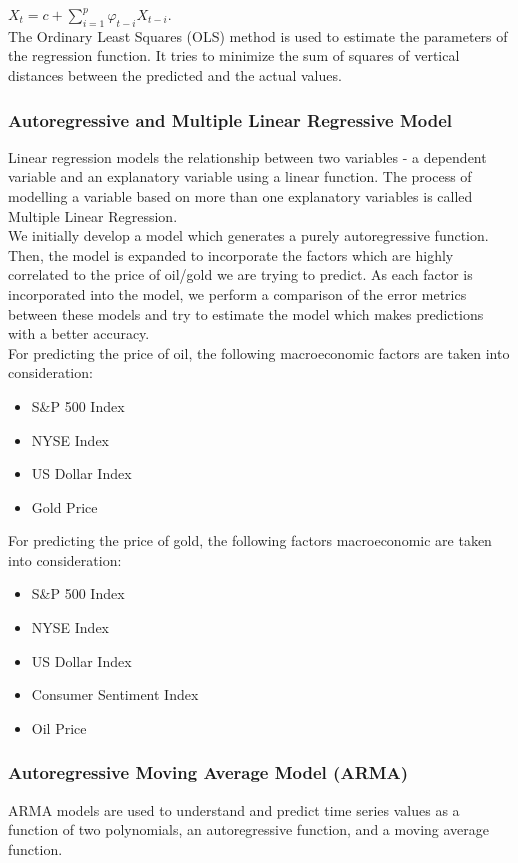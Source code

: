 \documentclass[runningheads]{llncs}
\begin{document}
$ X_{t} = c + \sum\limits_{i=1}^p \varphi_{t-i}X_{t-i}$. \\

\noindent The Ordinary Least Squares (OLS) method is used to estimate the parameters of the regression function. It tries to minimize the sum of squares of vertical distances between the predicted and the actual values. 

\subsubsection{Autoregressive and Multiple Linear Regressive Model}
Linear regression models the relationship between two variables - a dependent variable and an explanatory variable using a linear function. The process of modelling a variable based on more than one explanatory variables is called Multiple Linear Regression. \\
   
\noindent We initially develop a model which generates a purely autoregressive function. Then, the model is expanded to incorporate the factors which are highly correlated to the price of oil/gold we are trying to predict. As each factor is incorporated into the model, we perform a comparison of the error metrics between these models and try to estimate the model which makes predictions with a better accuracy.\\

For predicting the price of oil, the following macroeconomic factors are taken into consideration:
\begin {itemize}
\item S\&P 500 Index
\item NYSE Index
\item US Dollar Index
\item Gold Price
\end {itemize}

For predicting the price of gold, the following factors macroeconomic are taken into consideration:
\begin {itemize}
\item S\&P 500 Index
\item NYSE Index
\item US Dollar Index
\item Consumer Sentiment Index
\item Oil Price
\end {itemize}


\subsubsection{Autoregressive Moving Average Model (ARMA)}
ARMA models are used to understand and predict time series values as a function of two polynomials, an autoregressive function, and a moving average function. 
\\
\end{document}
